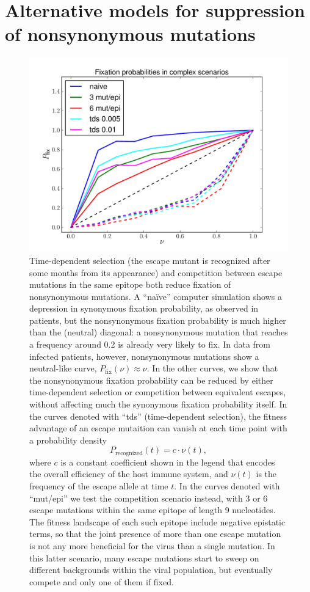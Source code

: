 \documentclass[rmp]{revtex4}
\begin{document}
\section{Alternative models for suppression of nonsynonymous mutations}
\begin{figure}[h]
\begin{center}
\includegraphics[width=0.5\linewidth]{simulations_graduallyepitopesandtimeselec}
\caption{Time-dependent selection (the escape mutant is recognized after some
months from its appearance) and competition between escape mutations in the same
epitope both reduce fixation of nonsynonymous mutations. A ``na\"ive'' computer
simulation shows a depression in synonymous fixation probability, as observed in
patients, but the nonsynonymous fixation probability is much higher than the
(neutral) diagonal: a nonsynonymous mutation that reaches a frequency around
0.2 is already very likely to fix. In data from infected patients, however,
nonsynonymous mutations show a neutral-like curve,
$P_\text{fix}(\nu) \approx \nu$. In the other curves, we show that the
nonsynonymous fixation probability can be reduced by either time-dependent
selection or competition between equivalent escapes, without affecting much the
synonymous fixation probability itself.
In the curves denoted with ``tds'' (time-dependent selection), the fitness advantage of
an escape mutaition can vanish at each time point with a probability density
\[ P_\text{recognized}(t) = c \cdot \nu(t), \]
where $c$ is a constant coefficient shown in the legend that encodes the overall
efficiency of the host immune system, and $\nu(t)$ is the frequency of the
escape allele at time $t$.
In the curves denoted with ``mut/epi'' we test the
competition scenario instead, with 3 or 6 escape mutations within the same
epitope of length 9 nucleotides. The fitness landscape of each such epitope
include negative epistatic terms, so that the joint presence of more than one
escape mutation is not any more beneficial for the virus than a single mutation.
In this latter scenario, many escape mutations start to sweep on different
backgrounds within the viral population, but eventually compete and only one of
them if fixed.}
\label{fig:tds_wec}
\end{center}
\end{figure}


\end{document}
